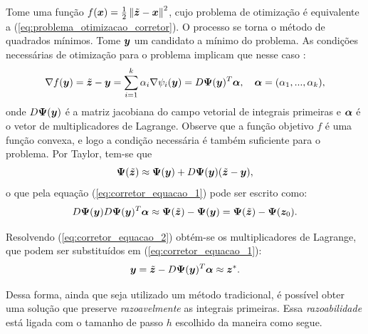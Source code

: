 Tome uma função $f(\bm x) = \frac{1}{2} \left\Vert \tilde{\bm z} - \bm x \right\Vert^2$, cujo problema de otimização é equivalente a (\ref{eq:problema_otimizacao_corretor}). O processo se torna o método de quadrados mínimos. Tome $\bm y$ um candidato a mínimo do problema. As condições necessárias de otimização para o problema implicam que nesse caso \citep{Friedlander1994}:
\begin{equation}\label{eq:corretor_equacao_1}
    \nabla f(\bm y) = \tilde{\bm z} - \bm y
    = \sum_{i=1}^k \alpha_i \nabla \psi_i (\bm y) = D \bm \Psi (\bm y)^T \bm \alpha, 
    \quad \bm \alpha = (\alpha_1, ..., \alpha_k),
\end{equation}
onde $D \bm \Psi (\bm y)$ é a matriz jacobiana do campo vetorial de integrais primeiras e $\bm \alpha$ é o vetor de multiplicadores de Lagrange. Observe que a função objetivo $f$ é uma função convexa, e logo a condição necessária é também suficiente para o problema. Por Taylor, tem-se que
\begin{equation*}
    \bm \Psi (\tilde{\bm z}) \approx \bm \Psi (\bm y) + D \bm \Psi(\bm y) (\tilde{\bm z} - \bm y),
\end{equation*}
o que pela equação (\ref{eq:corretor_equacao_1}) pode ser escrito como:
\begin{equation}\label{eq:corretor_equacao_2}
    D \bm \Psi(\bm y) D \bm \Psi(\bm y)^T \bm \alpha 
    \approx
    \bm \Psi (\tilde{\bm z}) - \bm \Psi(\bm y)
    = 
    \bm \Psi (\tilde{\bm z}) - \bm \Psi(\bm z_0).
\end{equation}

Resolvendo (\ref{eq:corretor_equacao_2}) obtém-se os multiplicadores de Lagrange, que podem ser substituídos em (\ref{eq:corretor_equacao_1}):
\begin{equation*}
    \bm y = \tilde{\bm z} - D \bm \Psi(\bm y)^T \bm \alpha \approx \bm z^*.
\end{equation*}

Dessa forma, ainda que seja utilizado um método tradicional, é possível obter uma solução que preserve \textit{razoavelmente} as integrais primeiras. Essa \textit{razoabilidade} está ligada com o tamanho de passo $h$ escolhido da maneira como segue.

